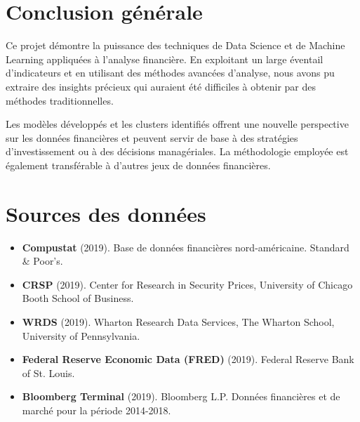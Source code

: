 \documentclass[11pt]{report}
\begin{document}
\chapter*{Conclusion générale}
Ce projet démontre la puissance des techniques de Data Science et de Machine Learning appliquées à l'analyse financière. En exploitant un large éventail d'indicateurs et en utilisant des méthodes avancées d'analyse, nous avons pu extraire des insights précieux qui auraient été difficiles à obtenir par des méthodes traditionnelles.

Les modèles développés et les clusters identifiés offrent une nouvelle perspective sur les données financières et peuvent servir de base à des stratégies d'investissement ou à des décisions managériales. La méthodologie employée est également transférable à d'autres jeux de données financières.

\chapter*{Sources des données}
\begin{itemize}
    \item \textbf{Compustat} (2019). Base de données financières nord-américaine. Standard \& Poor's.
    \item \textbf{CRSP} (2019). Center for Research in Security Prices, University of Chicago Booth School of Business.
    \item \textbf{WRDS} (2019). Wharton Research Data Services, The Wharton School, University of Pennsylvania.
    \item \textbf{Federal Reserve Economic Data (FRED)} (2019). Federal Reserve Bank of St. Louis.
    \item \textbf{Bloomberg Terminal} (2019). Bloomberg L.P. Données financières et de marché pour la période 2014-2018.
\end{itemize}
\end{document}
